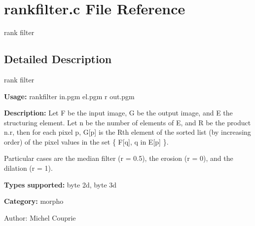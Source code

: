 \section{rankfilter.c File Reference}
\label{rankfilter_8c}
rank filter 



\subsection{Detailed Description}
rank filter 

{\bf Usage:} rankfilter in.pgm el.pgm r out.pgm

{\bf Description:} Let F be the input image, G be the output image, and E the structuring element. Let n be the number of elements of E, and R be the product n.r, then for each pixel p, G[p] is the Rth element of the sorted list (by increasing order) of the pixel values in the set \{ F[q], q in E[p] \}.

Particular cases are the median filter (r = 0.5), the erosion (r = 0), and the dilation (r = 1).

{\bf Types supported:} byte 2d, byte 3d

{\bf Category:} morpho

\begin{Desc}
\item[Author:]Michel Couprie \end{Desc}
